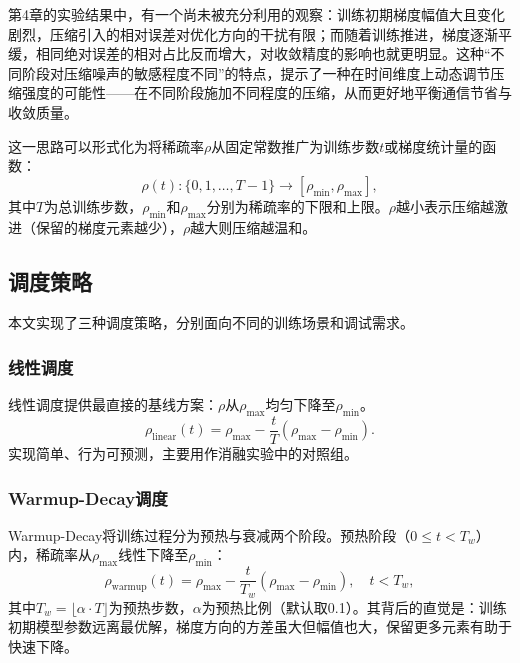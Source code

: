 第4章的实验结果中，有一个尚未被充分利用的观察：训练初期梯度幅值大且变化剧烈，压缩引入的相对误差对优化方向的干扰有限；而随着训练推进，梯度逐渐平缓，相同绝对误差的相对占比反而增大，对收敛精度的影响也就更明显。这种``不同阶段对压缩噪声的敏感程度不同''的特点，提示了一种在时间维度上动态调节压缩强度的可能性——在不同阶段施加不同程度的压缩，从而更好地平衡通信节省与收敛质量。

这一思路可以形式化为将稀疏率\(\rho\)从固定常数推广为训练步数\(t\)或梯度统计量的函数：
\begin{equation}
\rho(t): \{0, 1, \ldots, T-1\} \to [\rho_{\min}, \rho_{\max}],
\label{eq:adaptive-schedule}
\end{equation}
其中\(T\)为总训练步数，\(\rho_{\min}\)和\(\rho_{\max}\)分别为稀疏率的下限和上限。\(\rho\)越小表示压缩越激进（保留的梯度元素越少），\(\rho\)越大则压缩越温和。

\subsection{调度策略}

本文实现了三种调度策略，分别面向不同的训练场景和调试需求。

\subsubsection{线性调度}

线性调度提供最直接的基线方案：\(\rho\)从\(\rho_{\max}\)均匀下降至\(\rho_{\min}\)。
\begin{equation}
\rho_{\text{linear}}(t) = \rho_{\max} - \frac{t}{T}(\rho_{\max} - \rho_{\min}).
\label{eq:linear-schedule}
\end{equation}
实现简单、行为可预测，主要用作消融实验中的对照组。

\subsubsection{Warmup-Decay调度}

Warmup-Decay将训练过程分为预热与衰减两个阶段。预热阶段（\(0 \le t < T_w\)）内，稀疏率从\(\rho_{\max}\)线性下降至\(\rho_{\min}\)：
\begin{equation}
\rho_{\text{warmup}}(t) = \rho_{\max} - \frac{t}{T_w}(\rho_{\max} - \rho_{\min}), \quad t < T_w,
\label{eq:warmup}
\end{equation}
其中\(T_w = \lfloor \alpha \cdot T \rfloor\)为预热步数，\(\alpha\)为预热比例（默认取0.1）。其背后的直觉是：训练初期模型参数远离最优解，梯度方向的方差虽大但幅值也大，保留更多元素有助于快速下降。

